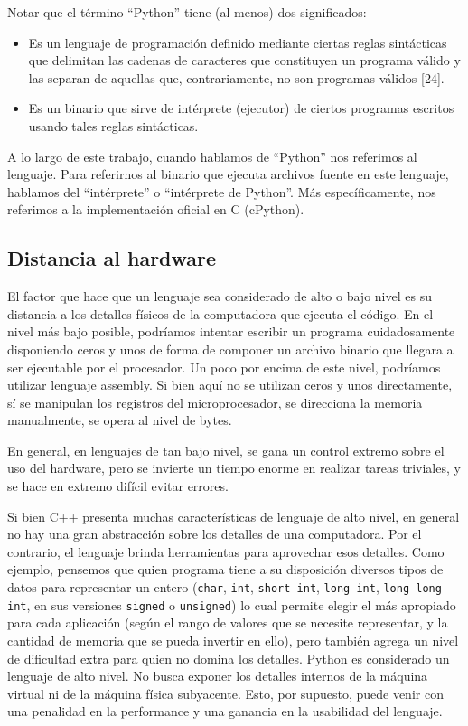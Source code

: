 Notar que el término ``Python'' tiene (al menos) dos significados:

\begin{itemize}
    \item Es un lenguaje de programación definido mediante ciertas reglas
sintácticas que delimitan las cadenas de caracteres que constituyen un programa
válido y las separan de aquellas que, contrariamente, no son programas válidos
[24].

    \item Es un binario que sirve de intérprete (ejecutor) de ciertos programas
escritos usando tales reglas sintácticas.
\end{itemize}

A lo largo de este trabajo, cuando hablamos de ``Python'' nos referimos al
lenguaje. Para referirnos al binario que ejecuta archivos fuente en este
lenguaje, hablamos del ``intérprete'' o ``intérprete de Python''. Más
específicamente, nos referimos a la implementación oficial en C (cPython). 

\subsection{Distancia al hardware}

El factor que hace que un lenguaje sea considerado de alto o bajo nivel es su
distancia a los detalles físicos de la computadora que ejecuta el código.
En el nivel más bajo posible, podríamos intentar escribir un programa
cuidadosamente disponiendo ceros y unos de forma de componer un archivo binario
que llegara a ser ejecutable por el procesador. Un poco por encima de este
nivel, podríamos utilizar lenguaje assembly. Si bien aquí no se utilizan ceros
y unos directamente, sí se manipulan los registros del microprocesador, se
direcciona la memoria manualmente, se opera al nivel de bytes.

En general, en lenguajes de tan bajo nivel, se gana un control extremo sobre el
uso del hardware, pero se invierte un tiempo enorme en realizar tareas
triviales, y se hace en extremo difícil evitar errores.

Si bien C++ presenta muchas características de lenguaje de alto nivel, en
general no hay una gran abstracción sobre los detalles de una computadora. Por
el contrario, el lenguaje brinda herramientas para aprovechar esos detalles.
Como ejemplo, pensemos que quien programa tiene a su disposición diversos tipos
de datos para representar un entero (\verb!char!, \verb!int!, \verb!short int!,
\verb!long int!, \verb!long long int!, en sus versiones \verb!signed! o
\verb!unsigned!) lo cual permite elegir el más apropiado para cada aplicación
(según el rango de valores que se necesite representar, y la cantidad de
memoria que se pueda invertir en ello), pero también agrega un nivel de
dificultad extra para quien no domina los detalles. Python es considerado un
lenguaje de alto nivel. No busca exponer los detalles internos de la máquina
virtual ni de la máquina física subyacente. Esto, por supuesto, puede venir con
una penalidad en la performance y una ganancia en la usabilidad del lenguaje.


